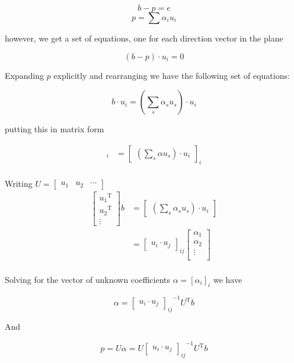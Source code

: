 \documentclass{article}      %
\newcommand{\transpose}[1]{{{#1}^{\text{T}}}}
\begin{document}
\[
b - p = e
\]
\[
p = \sum \alpha_i u_i
\]

however, we get a set of equations, one for each direction vector in the plane

\[
(b - p) \cdot u_i = 0
\]

Expanding $p$ explicitly and rearranging we have the following set of equations:

\[
b \cdot u_i = (\sum_s \alpha_s u_s) \cdot u_i
\]

putting this in matrix form

\begin{align*}
[b \cdot u_i]_i 
&= 
{
\begin{bmatrix}
(\sum_s \alpha u_s) \cdot u_i
\end{bmatrix}
}_i \\
\end{align*}

Writing $U = 
\begin{bmatrix}
u_1 & u_2 & \cdots 
\end{bmatrix}$
\begin{align*}
\begin{bmatrix}
\transpose{u_1} \\
\transpose{u_2} \\
\vdots 
\end{bmatrix}
b
&= 
\begin{bmatrix}
(\sum_s \alpha_s u_s) \cdot u_i
\end{bmatrix} \\
&= 
{
\begin{bmatrix}
u_i \cdot u_j
\end{bmatrix}
}_{ij}
\begin{bmatrix}
\alpha_1 \\
\alpha_2 \\
\vdots \\
\end{bmatrix} \\
\end{align*}

Solving for the vector of unknown coefficients $\alpha = [\alpha_i]_i$ we have

\[
\alpha
=
{{
\begin{bmatrix}
u_i \cdot u_j
\end{bmatrix}
}_{ij}}^{-1}
\transpose{U} b
\]

And 

\begin{equation}
p = U \alpha = U
{{
\begin{bmatrix}
u_i \cdot u_j

\end{bmatrix}
}_{ij}}^{-1}
\transpose{U} b
\end{equation}
\end{document}

